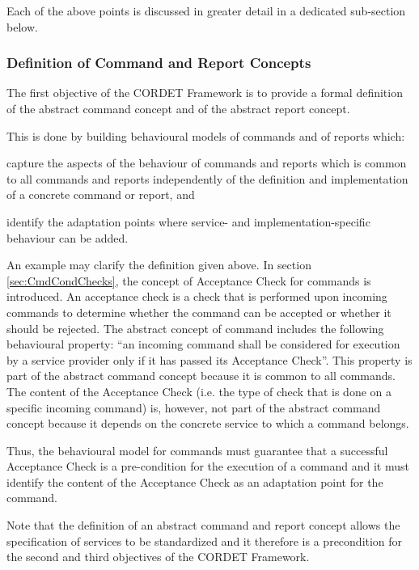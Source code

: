 \documentclass[a4paper,10pt]{article}
\newenvironment{fw_enumerate}					%
{\begin{enumerate}
  \setlength{\itemsep}{1mm}
  \setlength{\parskip}{0pt}
  \setlength{\parsep}{0pt}}
{\end{enumerate}}
\begin{document}
Each of the above points is discussed in greater detail in a dedicated sub-section below. 

\subsubsection{Definition of Command and Report Concepts}\label{sec:DefCmdRepConcepts}

The first objective of the CORDET Framework is to provide a formal definition of the abstract command concept and of the abstract report concept. 

This is done by building behavioural models of commands and of reports which:

\begin{fw_enumerate}
\item{} capture the aspects of the behaviour of commands and reports which is common to all commands and reports independently of the definition and implementation of a concrete command or report, and
\item{} identify the adaptation points where service- and implementation-specific behaviour can be added.
\end{fw_enumerate}

An example may clarify the definition given above. 
In section \ref{sec:CmdCondChecks}, the concept of Acceptance Check for commands is introduced. 
An acceptance check is a check that is performed upon incoming commands to determine whether the command can be accepted or whether it should be rejected. 
The abstract concept of command includes the following behavioural property: “an incoming command shall be considered for execution by a service provider only if it has passed its Acceptance Check”. 
This property is part of the abstract command concept because it is common to all commands. 
The content of the Acceptance Check (i.e. the type of check that is done on a specific incoming command) is, however, not part of the abstract command concept because it depends on the concrete service to which a command belongs.

Thus, the behavioural model for commands must guarantee that a successful Acceptance Check is a pre-condition for the execution of a command and it must identify the content of the Acceptance Check as an adaptation point for the command.

Note that the definition of an abstract command and report concept allows the specification of services to be standardized and it therefore is a precondition for the second and third objectives of the CORDET Framework. 
\end{document}
